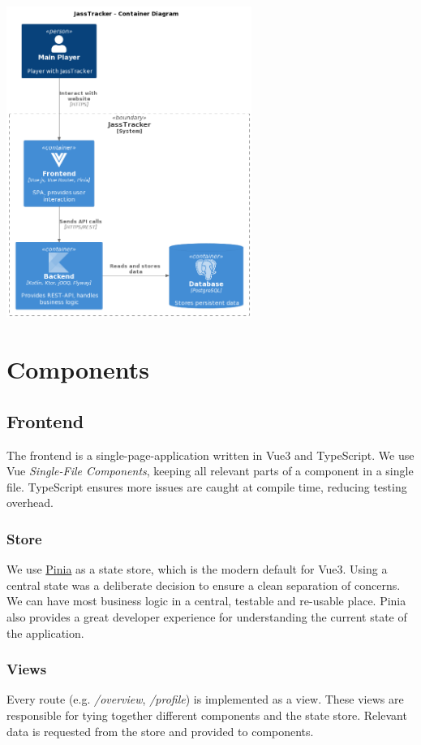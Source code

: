 \includegraphics[width=0.6\textwidth]{resources/diagrams/c4-2-container}

\section{Components}

\subsection{Frontend}
The frontend is a single-page-application written in Vue3 and TypeScript.
We use Vue \emph{Single-File Components}, keeping all relevant parts of a component in a single file.
TypeScript ensures more issues are caught at compile time, reducing testing overhead.

\subsubsection*{Store}
We use \href{https://pinia.vuejs.org/}{Pinia} as a state store, which is the modern default for Vue3.
Using a central state was a deliberate decision to ensure a clean separation of concerns.
We can have most business logic in a central, testable and re-usable place.
Pinia also provides a great developer experience for understanding the current state of the application.

\subsubsection*{Views}
Every route (e.g. \emph{/overview}, \emph{/profile}) is implemented as a view.
These views are responsible for tying together different components and the state store.
Relevant data is requested from the store and provided to components.

